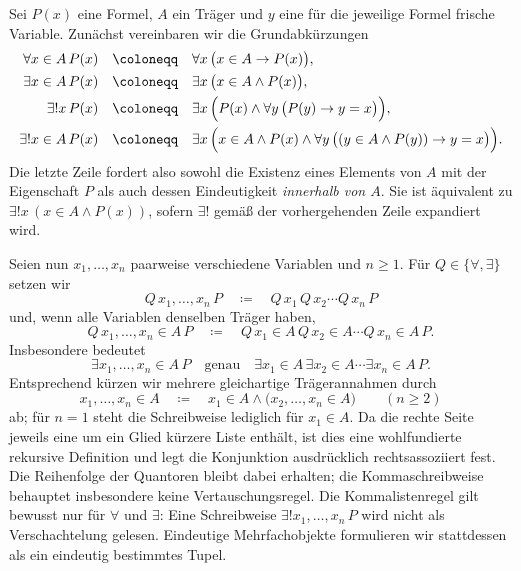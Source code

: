 \documentclass[main.tex]{subfiles}
\begin{document}
\begin{definition}
\label{def:bounded-quantifier-list-meta}
Sei \(P(x)\) eine Formel, \(A\) ein Träger und \(y\) eine für die
jeweilige Formel frische Variable. Zunächst vereinbaren wir die
Grundabkürzungen
\[
  \begin{aligned}
    \forall x\in A\,P(x)
      &\quad\coloneqq\quad
        \forall x\,\bigl(x\in A\rightarrow P(x)\bigr),\\
    \exists x\in A\,P(x)
      &\quad\coloneqq\quad
        \exists x\,\bigl(x\in A\land P(x)\bigr),\\
    \exists!x\,P(x)
      &\quad\coloneqq\quad
        \exists x\,\Bigl(P(x)\land
          \forall y\,\bigl(P(y)\rightarrow y=x\bigr)\Bigr),\\
    \exists!x\in A\,P(x)
      &\quad\coloneqq\quad
        \exists x\,\Bigl(x\in A\land P(x)\land
          \forall y\,\bigl((y\in A\land P(y))\rightarrow y=x\bigr)\Bigr).
  \end{aligned}
\]
Die letzte Zeile fordert also sowohl die Existenz eines Elements von
\(A\) mit der Eigenschaft \(P\) als auch dessen Eindeutigkeit
\emph{innerhalb von \(A\)}. Sie ist äquivalent zu
\(\exists!x\,(x\in A\land P(x))\), sofern \(\exists!\) gemäß der
vorhergehenden Zeile expandiert wird.

Seien nun \(x_1,\ldots,x_n\) paarweise verschiedene Variablen und
\(n\geq 1\). Für \(Q\in\{\forall,\exists\}\) setzen wir
\[
  Q\,x_1,\ldots,x_n\,P
  \quad\coloneqq\quad
  Q\,x_1\,Q\,x_2\cdots Q\,x_n\,P
\]
und, wenn alle Variablen denselben Träger haben,
\[
  Q\,x_1,\ldots,x_n\in A\,P
  \quad\coloneqq\quad
  Q\,x_1\in A\,Q\,x_2\in A\cdots Q\,x_n\in A\,P.
\]
Insbesondere bedeutet
\[
  \exists x_1,\ldots,x_n\in A\,P
  \quad\text{genau}\quad
  \exists x_1\in A\,\exists x_2\in A\cdots
  \exists x_n\in A\,P.
\]
Entsprechend kürzen wir mehrere gleichartige Trägerannahmen durch
\[
  x_1,\ldots,x_n\in A
  \quad\coloneqq\quad
  x_1\in A\land\bigl(x_2,\ldots,x_n\in A\bigr)
  \qquad(n\geq 2)
\]
ab; für \(n=1\) steht die Schreibweise lediglich für \(x_1\in A\).
Da die rechte Seite jeweils eine um ein Glied kürzere Liste enthält,
ist dies eine wohlfundierte rekursive Definition und legt die
Konjunktion ausdrücklich rechtsassoziiert fest. Die Reihenfolge der
Quantoren bleibt dabei erhalten; die Kommaschreibweise behauptet
insbesondere keine Vertauschungsregel.
Die Kommalistenregel gilt bewusst nur für \(\forall\) und \(\exists\):
Eine Schreibweise \(\exists!x_1,\ldots,x_n\,P\) wird nicht als
Verschachtelung gelesen. Eindeutige Mehrfachobjekte formulieren wir
stattdessen als ein eindeutig bestimmtes Tupel.
\end{definition}
\end{document}
